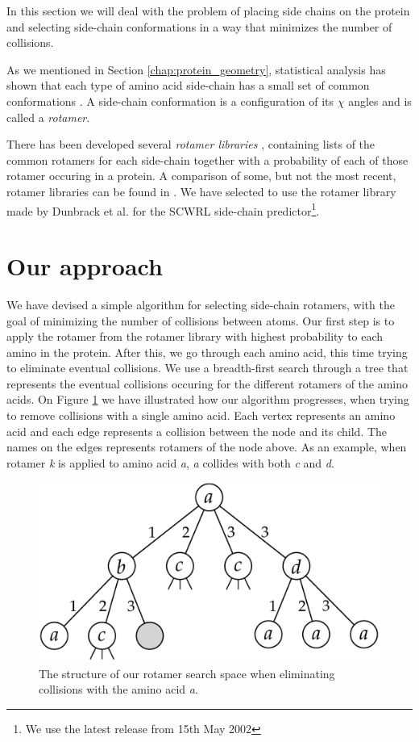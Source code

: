 In this section we will deal with the problem of placing side chains
on the protein and selecting side-chain conformations in a way that
minimizes the number of collisions.

As we mentioned in Section \ref{chap:protein_geometry}, statistical
analysis has shown that each type of amino acid side-chain has a small
set of common conformations \cite{dunbrack2002rotamer}. A side-chain
conformation is a configuration of its $\chi$ angles and is called a
\textit{rotamer}.

There has been developed several \textit{rotamer libraries}
\cite{dunbrack1997bayesian, lovell2000penultimate}, containing lists
of the common rotamers for each side-chain together with a probability
of each of those rotamer occuring in a protein. A comparison of some,
but not the most recent, rotamer libraries can be found in
\cite{dunbrack2002rotamer}. We have selected to use the rotamer
library made by Dunbrack et al. for the SCWRL side-chain
predictor\footnote{We use the latest release from 15th May 2002}.

\section{Our approach}
We have devised a simple algorithm for selecting side-chain rotamers,
with the goal of minimizing the number of collisions between
atoms. Our first step is to apply the rotamer from the rotamer library
with highest probability to each amino in the protein. After this, we
go through each amino acid, this time trying to eliminate eventual
collisions. We use a breadth-first search through a tree that
represents the eventual collisions occuring for the different rotamers
of the amino acids. On Figure \ref{fig:rotamer-search-tree} we have
illustrated how our algorithm progresses, when trying to remove
collisions with a single amino acid. Each vertex represents an amino
acid and each edge represents a collision between the node and its
child. The names on the edges represents rotamers of the node
above. As an example, when rotamer \textit{k} is applied to amino acid
\textit{a}, \textit{a} collides with both \textit{c} and \textit{d}.


\begin{figure}
	\centering
	\includegraphics[width=.9\columnwidth]{figures/rotamersearch}
	\caption{The structure of our rotamer search space when eliminating
      collisions with the amino acid \textit{a}.}
    \label{fig:rotamer-search-tree}
\end{figure}

